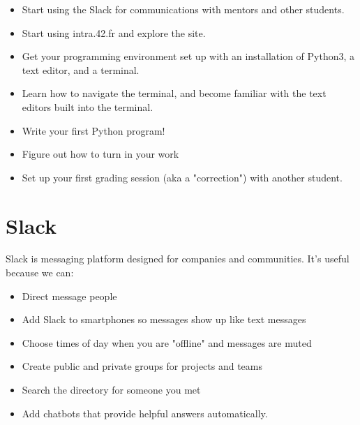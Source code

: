 \documentclass{42-en}
\begin{document}
\begin{itemize}

	\item Start using the Slack for communications with mentors and other students.

	\item Start using intra.42.fr and explore the site.

	\item Get your programming environment set up with an installation of Python3, a text editor, and a terminal.

	\item Learn how to navigate the terminal, and become familiar with the text editors built into the terminal.

	\item Write your first Python program!

	\item Figure out how to turn in your work 

	\item Set up your first grading session (aka a "correction") with another student. 

\end{itemize}



\chapter{Slack}

Slack is messaging platform designed for companies and communities. It's useful because we can:
\begin{itemize}

	\item Direct message people
	\item Add Slack to smartphones so messages show up like text messages
	\item Choose times of day when you are "offline" and messages are muted
	\item Create public and private groups for projects and teams
	\item Search the directory for someone you met
	\item Add chatbots that provide helpful answers automatically.

\end{itemize}
\end{document}
